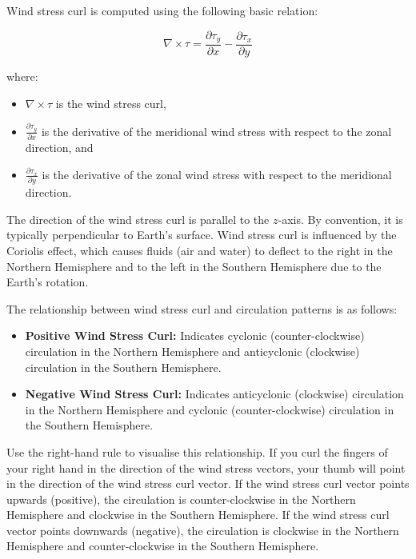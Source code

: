 \documentclass[
  letterpaper,
  DIV=11,
  numbers=noendperiod]{scrartcl}
\providecommand{\tightlist}{%
  \setlength{\itemsep}{0pt}\setlength{\parskip}{0pt}}\usepackage{longtable,booktabs,array}
\begin{document}
Wind stress curl is computed using the following basic relation:

\[\nabla \times \tau = \frac{\partial \tau_{y}}{\partial x} - \frac{\partial \tau_{x}}{\partial y}\]

where:

\begin{itemize}
\tightlist
\item
  \(\nabla \times \tau\) is the wind stress curl,
\item
  \(\frac{\partial \tau_{y}}{\partial x}\) is the derivative of the
  meridional wind stress with respect to the zonal direction, and
\item
  \(\frac{\partial \tau_{x}}{\partial y}\) is the derivative of the
  zonal wind stress with respect to the meridional direction.
\end{itemize}

The direction of the wind stress curl is parallel to the \(z\)-axis. By
convention, it is typically perpendicular to Earth's surface. Wind
stress curl is influenced by the Coriolis effect, which causes fluids
(air and water) to deflect to the right in the Northern Hemisphere and
to the left in the Southern Hemisphere due to the Earth's rotation.

The relationship between wind stress curl and circulation patterns is as
follows:

\begin{itemize}
\tightlist
\item
  \textbf{Positive Wind Stress Curl:} Indicates cyclonic
  (counter-clockwise) circulation in the Northern Hemisphere and
  anticyclonic (clockwise) circulation in the Southern Hemisphere.
\item
  \textbf{Negative Wind Stress Curl:} Indicates anticyclonic (clockwise)
  circulation in the Northern Hemisphere and cyclonic
  (counter-clockwise) circulation in the Southern Hemisphere.
\end{itemize}

Use the right-hand rule to visualise this relationship. If you curl the
fingers of your right hand in the direction of the wind stress vectors,
your thumb will point in the direction of the wind stress curl vector.
If the wind stress curl vector points upwards (positive), the
circulation is counter-clockwise in the Northern Hemisphere and
clockwise in the Southern Hemisphere. If the wind stress curl vector
points downwards (negative), the circulation is clockwise in the
Northern Hemisphere and counter-clockwise in the Southern Hemisphere.
\end{document}
